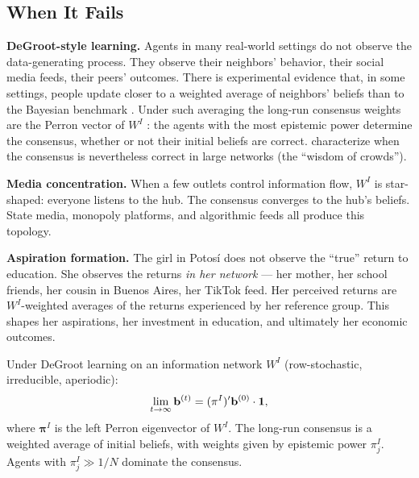 \documentclass[../structural_economics_book.tex]{subfiles}
\begin{document}
\subsection{When It Fails}

\textbf{DeGroot-style learning.} Agents in many real-world settings do not observe the data-generating process. They observe their neighbors' behavior, their social media feeds, their peers' outcomes. There is experimental evidence that, in some settings, people update closer to a weighted average of neighbors' beliefs than to the Bayesian benchmark \citep{chandrasekhar2020testing}. Under such averaging the long-run consensus weights are the Perron vector of $W^I$ \citep{degroot1974reaching}: the agents with the most epistemic power determine the consensus, whether or not their initial beliefs are correct. \citet{golub2010naive} characterize when the consensus is nevertheless correct in large networks (the ``wisdom of crowds'').

\textbf{Media concentration.} When a few outlets control information flow, $W^I$ is star-shaped: everyone listens to the hub. The consensus converges to the hub's beliefs. State media, monopoly platforms, and algorithmic feeds all produce this topology.

\textbf{Aspiration formation.} The girl in Potos\'{i} does not observe the ``true'' return to education. She observes the returns \textit{in her network} --- her mother, her school friends, her cousin in Buenos Aires, her TikTok feed. Her perceived returns are $W^I$-weighted averages of the returns experienced by her reference group. This shapes her aspirations, her investment in education, and ultimately her economic outcomes.

\begin{proposition}\label{ch04:prop:A3_beliefs}
Under DeGroot learning on an information network $W^I$ (row-stochastic, irreducible, aperiodic):
\begin{equation}
\lim_{t \to \infty} \mathbf{b}^{(t)} = (\pi^I)' \mathbf{b}^{(0)} \cdot \mathbf{1},
\end{equation}
where $\boldsymbol{\pi}^I$ is the left Perron eigenvector of $W^I$. The long-run consensus is a weighted average of initial beliefs, with weights given by epistemic power $\pi^I_j$. Agents with $\pi^I_j \gg 1/N$ dominate the consensus.
\end{proposition}
\end{document}
